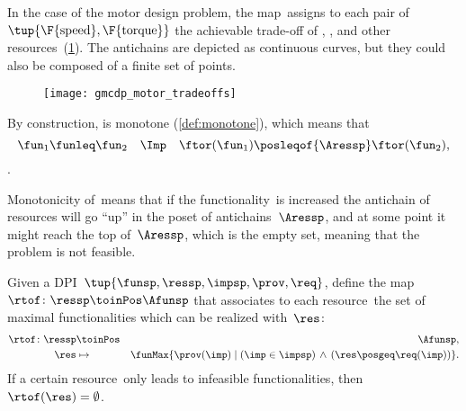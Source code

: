 \begin{example}
	In the case of the motor design problem, the map~\ftor assigns
	to each pair of~$\tup{\F{\text{speed}},\F{\text{torque}}}$
	the achievable trade-off of , , and other resources~(\cref{fig:motor-trade-offs}).
	The antichains are depicted as continuous curves, but they could also
	be composed of a finite set of points.

\end{example}
\begin{figure}
	\texttt{[image: gmcdp\_motor\_tradeoffs]}
	\caption{}
	\label{fig:motor-trade-offs}
\end{figure}

By construction, \ftor is monotone (\cref{def:monotone}), which means that
\begin{equation*}
	\fun_{1}\funleq\fun_{2}\quad\Imp\quad\ftor(\fun_{1})\posleqof{\Aressp}\ftor(\fun_{2}),
\end{equation*}.


Monotonicity of~\ftor means that if the functionality~\fun is increased the antichain of resources will go ``up'' in the poset of antichains~$\Aressp$,
and at some point it might reach the top of~$\Aressp$, which is the empty set, meaning that the problem is not feasible.

\begin{definition}
	\label{def:rtof}
	Given a DPI~$\tup{ \funsp,\ressp,\impsp,\prov,\req}$,
	define the map~$\rtof\colon \ressp\toinPos \Afunsp$ that associates
	to each resource~\res the set of maximal functionalities which can be realized with~$\res$:
	\begin{eqnarray*}
		\rtof\colon \ressp & \toinPos & \Afunsp,\\
		\res& \mapsto & \funMax\{\prov(\imp)\mid\left(\imp\in\impsp\right)\,\wedge\,\left(\res\posgeq\req(\imp)\right)\}.
	\end{eqnarray*}
	If a certain resource~\res only leads to infeasible functionalities, then~$\rtof(\res)=\emptyset$.
\end{definition}


